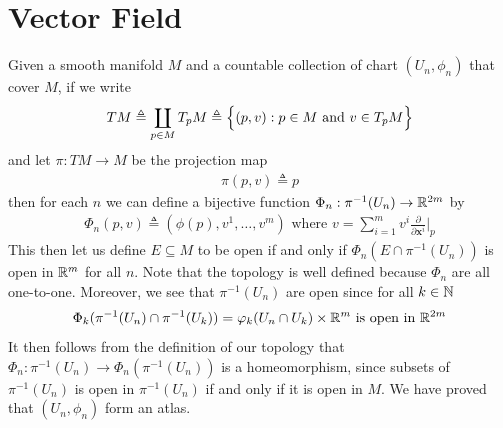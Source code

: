 \documentclass{report}
\begin{document}
\section{Vector Field}
\begin{abstract}

\end{abstract}
\begin{mdframed}
Given a smooth manifold $M$ and a countable collection of chart $(U_n, \phi_n) $ that cover $M$, if we write 
 \begin{align*}
TM\triangleq \coprod _{p \in M} T_pM\triangleq \Big\{ (p,v): p \in M\text{ and }v \in T_pM \Big\}
\end{align*}
and let $\pi:TM\rightarrow M$ be the projection map 
\begin{align*}
\pi (p,v)\triangleq p
\end{align*}
then for each $n$ we can define a bijective function  $\Phi_n:\pi^{-1}(U_n)\rightarrow \mathbb{R}^{2m}$ by 
\begin{align}
\label{tch}
  \Phi_n (p,v)\triangleq  (\phi (p), v^1,\dots ,v^m)\text{ where }v=\sum_{i=1}^m v^i \frac{\partial }{\partial \textbf{x}^i}\Big|_p
\end{align}
This then let us define $E\subseteq M$ to be open if and only if $\Phi_n (E\cap \pi^{-1}(U_n))$ is open in $\mathbb{R}^m$ for all  $n$. Note that  the topology is well defined because $\Phi_n$ are all one-to-one. Moreover, we see that $\pi^{-1}(U_n)$ are open since for all $k\in\mathbb{N}$
\begin{align*}
\Phi_k (\pi^{-1}(U_n)\cap \pi^{-1}(U_k))= \varphi_k(U_n \cap U_k)\times \mathbb{R}^m\text{ is open in }\mathbb{R}^{2m}
\end{align*}
It then follows from the definition of our topology that $\Phi_n:\pi^{-1}(U_n)\rightarrow \Phi_n(\pi^{-1}(U_n))$ is a homeomorphism, since subsets of $\pi^{-1}(U_n)$ is open in $\pi^{-1}(U_n)$ if and only if it is open in $M$. We have proved that $(U_n,\phi_n)$ form an atlas. \\


\end{mdframed}
\end{document}
